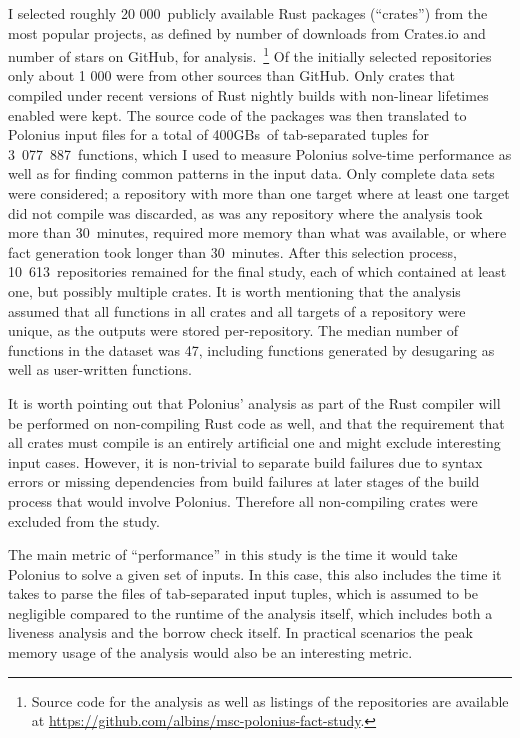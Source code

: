 \documentclass[11pt,a4paper,twoside,openany]{report}
\begin{document}
I selected roughly 20 000~publicly available Rust packages (``crates'') from the
most popular projects, as defined by number of downloads from Crates.io and
number of stars on GitHub, for analysis.~\footnote{Source code for the analysis
  as well as listings of the repositories are available at
  \url{https://github.com/albins/msc-polonius-fact-study}.} Of the initially
selected repositories only about 1 000 were from other sources than GitHub. Only
crates that compiled under recent versions of Rust nightly builds with
non-linear lifetimes enabled were kept. The source code of the packages was then
translated to Polonius input files for a total of 400GBs~of tab-separated tuples
for 3~077~887~functions, which I used to measure Polonius solve-time performance
as well as for finding common patterns in the input data. Only complete data
sets were considered; a repository with more than one target where at least one
target did not compile was discarded, as was any repository where the analysis
took more than 30~minutes, required more memory than what was available, or
where fact generation took longer than $30$~minutes. After this selection
process, 10~613~repositories remained for the final study, each of which
contained at least one, but possibly multiple crates. It is worth mentioning
that the analysis assumed that all functions in all crates and all targets of a
repository were unique, as the outputs were stored per-repository. The median
number of functions in the dataset was 47, including functions generated by
desugaring as well as user-written functions.

It is worth pointing out that Polonius' analysis as part of the Rust compiler
will be performed on non-compiling Rust code as well, and that the requirement
that all crates must compile is an entirely artificial one and might exclude
interesting input cases. However, it is non-trivial to separate build failures
due to syntax errors or missing dependencies from build failures at later stages
of the build process that would involve Polonius. Therefore all non-compiling
crates were excluded from the study.


The main metric of ``performance'' in this study is the time it would take
Polonius to solve a given set of inputs. In this case, this also includes the
time it takes to parse the files of tab-separated input tuples, which is assumed
to be negligible compared to the runtime of the analysis itself, which includes
both a liveness analysis and the borrow check itself. In practical scenarios the
peak memory usage of the analysis would also be an interesting metric.
\end{document}
